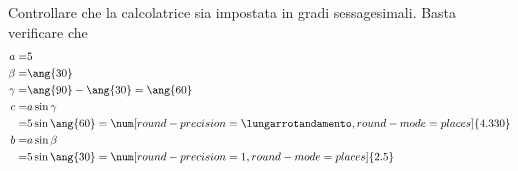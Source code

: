 Controllare che la calcolatrice sia impostata in gradi sessagesimali.
Basta verificare che \testgradi
\begin{align*}
a=&5\\
\beta=&\ang{30}\\
\gamma=&\ang{90}-\ang{30}=\ang{60}\\
c=&a\sin\gamma\\
=& 5\sin\ang{60}=\num[round-precision=\lungarrotandamento,round-mode=places]{4.330}\\
b=&a\sin\beta\\
=& 5\sin\ang{30}=\num[round-precision=1,round-mode=places]{2.5}
\end{align*}
 

